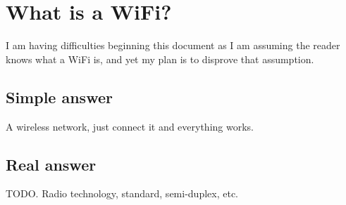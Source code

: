 \documentclass[../wifi-security.tex]{subfiles}
\begin{document}
\chapter{What is a WiFi?}

I am having difficulties beginning this document as I am assuming the reader knows what a WiFi is, and yet my plan is to disprove that assumption.



\section{Simple answer}

A wireless network, just connect it and everything works.

\section{Real answer}

TODO. Radio technology, standard, semi-duplex, etc.
\end{document}
